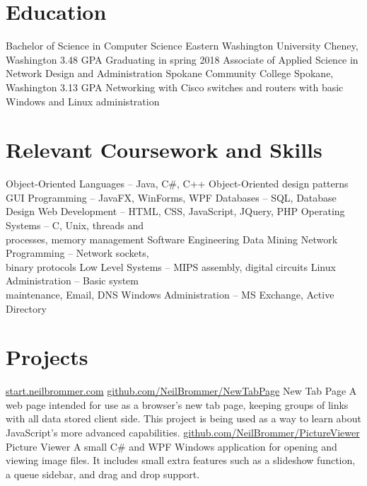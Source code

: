 \documentclass[11pt,letterpaper,sans]{moderncv}
\begin{document}
\makecvtitle{}


\section{Education}
	{Bachelor of Science in Computer Science}
	{Eastern Washington University}
	{Cheney, Washington}
	{3.48 GPA}
	{Graduating in spring 2018}
	{Associate of Applied Science in Network Design and Administration}
	{Spokane Community College}
	{Spokane, Washington}
	{3.13 GPA}
	{Networking with Cisco switches and routers with basic Windows and Linux
	administration}


\section{Relevant Coursework and Skills}
\cvlistdoubleitem %
	{Object-Oriented Languages -- Java, C\#, C++} %
	{Object-Oriented design patterns}
\cvlistdoubleitem %
	{GUI Programming -- JavaFX, WinForms, WPF} %
	{Databases -- SQL, Database Design} %
\cvlistdoubleitem %
	{Web Development -- HTML, CSS, JavaScript, JQuery, PHP} %
	{Operating Systems -- C, Unix, threads and\\ processes, memory management} %
\cvlistdoubleitem %
	{Software Engineering} %
	{Data Mining} %
\cvlistdoubleitem %
	{Network Programming -- Network sockets,\\ binary protocols} %
	{Low Level Systems -- MIPS assembly, digital circuits} %
\cvlistdoubleitem %
	{Linux Administration -- Basic system\\ maintenance, Email, DNS} %
	{Windows Administration -- MS Exchange, Active Directory} %


\section{Projects}
\cventry
	{ %
		\href{https://start.neilbrommer.com}{start.neilbrommer.com}
	}
	{ %
		\href{https://github.com/NeilBrommer/NewTabPage}
			{github.com/NeilBrommer/NewTabPage}
	}
	{New Tab Page} %
	{} %
	{} %
	{ %
		A web page intended for use as a browser's new tab page, keeping groups
		of links with all data stored client side. This project is being used as
		a way to learn about JavaScript's more advanced capabilities.
	}
\cventry
	{}
	{
		\href{https://github.com/NeilBrommer/PictureViewer}
			{github.com/NeilBrommer/PictureViewer}
	}
	{Picture Viewer}
	{}
	{}
	{
		A small C\# and WPF Windows application for opening and viewing image
		files. It includes small extra features such as a slideshow function, a
		queue sidebar, and drag and drop support.
	}
\end{document}

